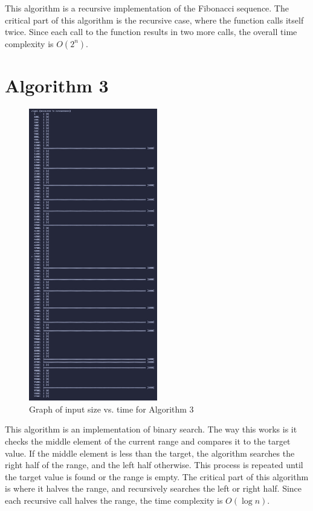 \documentclass{article}
\begin{document}
This algorithm is a recursive implementation of the Fibonacci sequence.
The critical part of this algorithm is the recursive case, where the function calls itself twice.
Since each call to the function results in two more calls, the overall time complexity is $O(2^n)$.

\section*{Algorithm 3}
\begin{figure}[H]
    \centering
    \includegraphics[width=0.5\textwidth]{./images/algo3.png}
    \caption{Graph of input size vs. time for Algorithm 3}
\end{figure}

This algorithm is an implementation of binary search.
The way this works is it checks the middle element of the current range and compares it to the target value.
If the middle element is less than the target, the algorithm searches the right half of the range, and the left half otherwise.
This process is repeated until the target value is found or the range is empty.
The critical part of this algorithm is where it halves the range, and recursively searches the left or right half.
Since each recursive call halves the range, the time complexity is $O(\log n)$.
\end{document}
